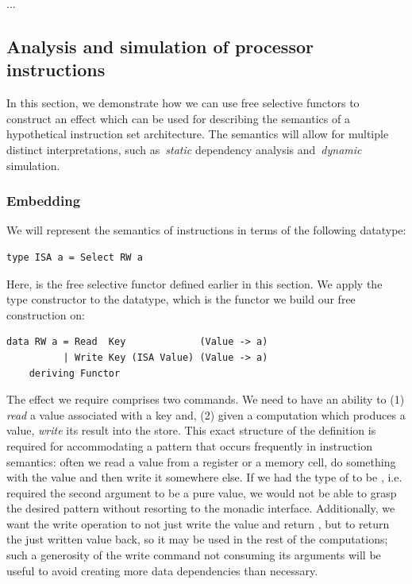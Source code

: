 ...

\subsection{Analysis and simulation of processor instructions}\label{sec-free-isa}

In this section, we demonstrate how we can use free selective functors to construct an
effect which can be used for describing the semantics of a hypothetical
instruction set architecture. The semantics will allow for
multiple distinct interpretations, such as~\emph{static} dependency
analysis and~\emph{dynamic} simulation.

\subsubsection{Embedding}

We will represent the semantics of instructions in terms of the following datatype:

\begin{verbatim}
type ISA a = Select RW a
\end{verbatim}

Here,  is the free selective functor defined earlier in this section.
We apply the  type constructor to the  datatype, which is the
functor we build our free construction on:

\begin{verbatim}
data RW a = Read  Key             (Value -> a)
          | Write Key (ISA Value) (Value -> a)
    deriving Functor
\end{verbatim}

The effect we require comprises two commands. We need to have an ability to (1)
\emph{read} a value associated with a key and, (2) given a computation which produces a value,
\emph{write} its result into the store.
This exact structure of the definition is required for accommodating a pattern that
occurs frequently in instruction semantics: often we read a value from a register or a memory
cell, do something with the value and then write it somewhere else.
If we had the type of  to be , i.e. required
the second argument to be a pure value,
we would not be able to grasp the desired pattern without resorting to the monadic interface. Additionally, we want the write
operation to not just write the value and return \hs{()}, but to return the just written value
back, so it may be used in the rest of the computations; such a generosity of the write
command not consuming its arguments will be useful to avoid creating more data dependencies
than necessary.

